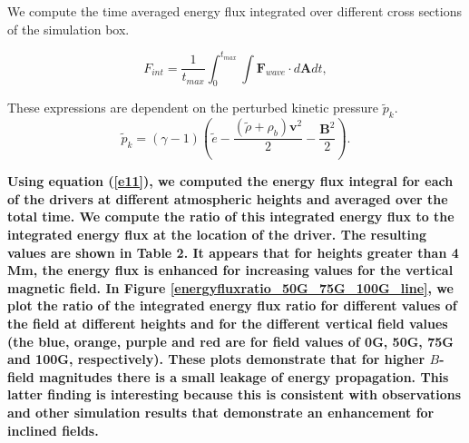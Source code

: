 \documentclass[linenumbers]{aastex63}
\newcommand{\bcr}{\bf\color{red}} %
\begin{document}
We compute the time averaged energy flux integrated over different cross sections of the simulation box.

\begin{equation}
F_{int}= \frac{1}{t_{max}} \int_{0}^{t_{max}} \int {\mathbf F}_{wave} \cdot d{\mathbf A}dt,
\label{e11}
\end{equation}

These expressions are dependent on the perturbed kinetic pressure $\tilde{p}_{k}$.
$$
\tilde{p}_{k}=\left(\gamma - 1\right)\left( \tilde{e}-\frac{ \left( \tilde{\rho} +\rho_b \right){\mathbf v}^2}{2}-\frac{{\mathbf B}^2}{2}\right).
$$

{\bcr
Using equation (\ref{e11}), we computed the energy flux integral for each of the drivers at different atmospheric heights and averaged over the total time. We compute the ratio of this integrated energy flux to the integrated energy flux at the location of the driver. The resulting values are shown in Table 2. It appears that for heights greater than 4 Mm, the energy flux is enhanced for increasing values for the vertical magnetic field. In Figure \ref{energyfluxratio_50G_75G_100G_line},  we plot the ratio of the integrated energy flux ratio for different values of the field at different heights and for the different vertical field values (the blue, orange, purple and red  are for field values of 0G, 50G, 75G and 100G, respectively). These plots demonstrate that for higher $B$-field magnitudes there is a small leakage of energy propagation. This latter finding is interesting because this is consistent with observations and other simulation results that demonstrate an enhancement for inclined fields.
}



\end{document}
